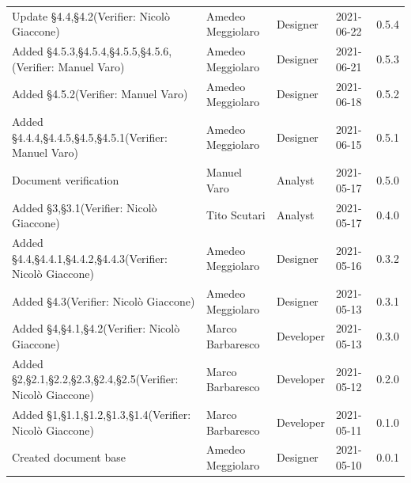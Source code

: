 \documentclass[a4paper]{article}
\begin{document}
\begin{center}
\begin{longtable}[!h]{p{160px} p{90px} p{60px} p{60px} p{50px}}
        Update \S{4.4},\S{4.2}\newline(Verifier: Nicolò Giaccone)                              & Amedeo Meggiolaro & Designer       & 2021-06-22    & 0.5.4             \\
        Added \S{4.5.3},\S{4.5.4},\S{4.5.5},\S{4.5.6},\newline(Verifier: Manuel Varo)          & Amedeo Meggiolaro & Designer       & 2021-06-21    & 0.5.3             \\
        Added \S{4.5.2}\newline(Verifier: Manuel Varo)                                         & Amedeo Meggiolaro & Designer       & 2021-06-18    & 0.5.2             \\
        Added \S{4.4.4},\S{4.4.5},\S{4.5},\S{4.5.1}\newline(Verifier: Manuel Varo)             & Amedeo Meggiolaro & Designer       & 2021-06-15    & 0.5.1             \\
        Document verification                                                                  & Manuel Varo       & Analyst        & 2021-05-17    & 0.5.0             \\
        Added \S{3},\S{3.1}\newline(Verifier: Nicolò Giaccone)                                 & Tito Scutari      & Analyst        & 2021-05-17    & 0.4.0             \\
        Added \S{4.4},\S{4.4.1},\S{4.4.2},\S{4.4.3}\newline(Verifier: Nicolò Giaccone)         & Amedeo Meggiolaro & Designer       & 2021-05-16    & 0.3.2             \\
        Added \S{4.3}\newline(Verifier: Nicolò Giaccone)                                       & Amedeo Meggiolaro & Designer       & 2021-05-13    & 0.3.1             \\
        Added \S{4},\S{4.1},\S{4.2}\newline(Verifier: Nicolò Giaccone)                         & Marco Barbaresco  & Developer      & 2021-05-13    & 0.3.0             \\
        Added \S{2},\S{2.1},\S{2.2},\S{2.3},\S{2.4},\S{2.5}\newline(Verifier: Nicolò Giaccone) & Marco Barbaresco  & Developer      & 2021-05-12    & 0.2.0             \\
        Added \S{1},\S{1.1},\S{1.2},\S{1.3},\S{1.4}\newline(Verifier: Nicolò Giaccone)         & Marco Barbaresco  & Developer      & 2021-05-11    & 0.1.0             \\
        Created document base                                                                  & Amedeo Meggiolaro & Designer       & 2021-05-10    & 0.0.1             \\
    \end{longtable}
\end{center}
\newpage
\tableofcontents
\newpage
\newpage
\listoffigures
\newpage






\end{document}
